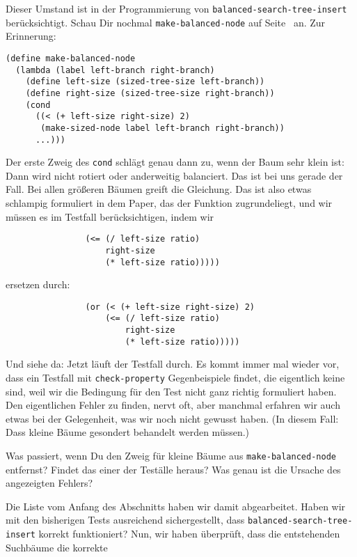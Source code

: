 Dieser Umstand ist in der Programmierung von
\lstinline{balanced-search-tree-insert} berücksichtigt.  Schau Dir
nochmal \lstinline{make-balanced-node} auf
Seite~\pageref{func:make-balanced-node} an.  Zur Erinnerung:
%
\begin{lstlisting}
(define make-balanced-node
  (lambda (label left-branch right-branch)
    (define left-size (sized-tree-size left-branch))
    (define right-size (sized-tree-size right-branch))
    (cond
      ((< (+ left-size right-size) 2)
       (make-sized-node label left-branch right-branch))
      ...)))
\end{lstlisting}
%
Der erste Zweig des \lstinline{cond} schlägt genau dann zu, wenn der
Baum sehr klein ist: Dann wird nicht rotiert oder anderweitig
balanciert.  Das ist bei uns gerade der Fall.  Bei allen größeren
Bäumen greift die Gleichung.  Das ist also etwas schlampig formuliert
in dem Paper, das der Funktion zugrundeliegt, und wir müssen es im
Testfall berücksichtigen, indem wir
%
\begin{lstlisting}
                (<= (/ left-size ratio)
                    right-size
                    (* left-size ratio)))))
\end{lstlisting}
%
ersetzen durch:
%
\begin{lstlisting}
                (or (< (+ left-size right-size) 2)
                    (<= (/ left-size ratio)
                        right-size
                        (* left-size ratio)))))
\end{lstlisting}
%
Und siehe da: Jetzt läuft der Testfall durch.
Es kommt immer mal wieder vor, dass ein
Testfall mit \lstinline{check-property} Gegenbeispiele findet, die
eigentlich keine sind, weil wir die Bedingung für den Test nicht ganz
richtig formuliert haben.  Den eigentlichen Fehler zu finden, nervt
oft, aber manchmal erfahren wir auch etwas bei der Gelegenheit, was
wir noch nicht gewusst haben.  (In diesem Fall: Dass kleine Bäume
gesondert behandelt werden müssen.)
%
\begin{aufgabeinline}
  Was passiert, wenn Du den Zweig für kleine Bäume aus
  \lstinline{make-balanced-node} entfernst?  Findet das einer der
  Teställe heraus?  Was genau ist die Ursache des angezeigten Fehlers?
\end{aufgabeinline}
%
Die Liste vom Anfang des Abschnitts haben wir damit abgearbeitet.
Haben wir mit den bisherigen Tests ausreichend sichergestellt, dass
\lstinline{balanced-search-tree-insert} korrekt funktioniert?
Nun, wir haben überprüft, dass die entstehenden Suchbäume die korrekte
